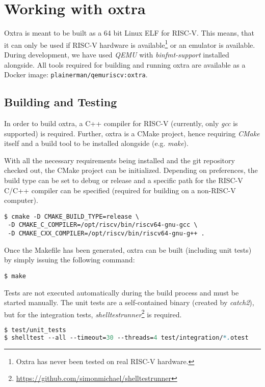 \section{Working with oxtra}
\label{Build Environment and Dependencies}
Oxtra is meant to be built as a 64 bit Linux ELF for RISC-V. This means, that it can only be used if RISC-V hardware is available\footnote{Oxtra has never been tested on real RISC-V hardware.} or an emulator is available. During development, we have used \emph{QEMU} with \emph{binfmt-support} installed alongside. All tools required for building and running oxtra are available as a Docker image: \texttt{plainerman/qemuriscv:oxtra}.

\subsection{Building and Testing}
In order to build oxtra, a C++ compiler for RISC-V (currently, only \emph{gcc} is supported) is required. Further, oxtra is a CMake project, hence requiring \emph{CMake} itself and a build tool to be installed alongside (e.g. \emph{make}).

With all the necessary requirements being installed and the git repository checked out, the CMake project can be initialized. Depending on preferences, the build type can be set to debug or release and a specific path for the RISC-V C/C++ compiler can be specified (required for building on a non-RISC-V computer). 

\begin{lstlisting}
$ cmake -D CMAKE_BUILD_TYPE=release \
 -D CMAKE_C_COMPILER=/opt/riscv/bin/riscv64-gnu-gcc \ 
 -D CMAKE_CXX_COMPILER=/opt/riscv/bin/riscv64-gnu-g++ .
\end{lstlisting}

Once the Makefile has been generated, oxtra can be built (including unit tests) by simply issuing the following command:

\begin{lstlisting}
$ make
\end{lstlisting}

Tests are not executed automatically during the build process and must be started manually. The unit tests are a self-contained binary (created by \emph{catch2}), but for the integration tests, \emph{shelltestrunner}\footnote{\url{https://github.com/simonmichael/shelltestrunner}} is required.

\begin{lstlisting}[language=Perl]
$ test/unit_tests
$ shelltest --all --timeout=30 --threads=4 test/integration/*.otest
\end{lstlisting}

